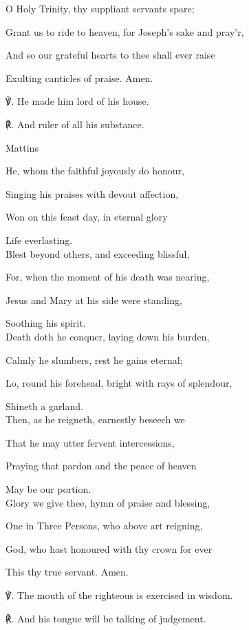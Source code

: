 \begin{paracol}{2}[]
\begin{hangparas}{1.25em}{1}
O Holy Trinity, thy suppliant servants spare;

Grant us to ride to heaven, for Joseph's sake and pray'r,

And so our grateful hearts to thee shall ever raise

Exulting canticles of praise. Amen.\\
\end{hangparas}
    ℣. He made him lord of his house.

	℟. And ruler of all his substance.
	
\switchcolumn

\begin{inhead}
	Mattins
\end{inhead}
\begin{hangparas}{1.25em}{1}
He, whom the faithful joyously do honour,

Singing his praises with devout affection,

Won on this feast day, in eternal glory

Life everlasting.\\

Blest beyond others, and exceeding blissful,

For, when the moment of his death was nearing,

Jesus and Mary at his side were standing,

Soothing his spirit.\\

Death doth he conquer, laying down his burden,

Calmly he slumbers, rest he gains eternal;

Lo, round his forehead, bright with rays of splendour,

Shineth a garland.\\

Then, as he reigneth, earnestly beseech we

That he may utter fervent intercessions,

Praying that pardon and the peace of heaven

May be our portion.\\

Glory we give thee, hymn of praise and blessing,

One in Three Persons, who above art reigning,

God, who hast honoured with thy crown for ever

This thy true servant. Amen.\\
\end{hangparas}
    ℣. The mouth of the righteous is exercised in wisdom.

	℟. And his tongue will be talking of judgement.

\fussy
\end{paracol}

